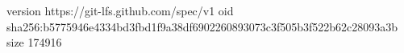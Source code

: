 version https://git-lfs.github.com/spec/v1
oid sha256:b5775946e4334bd3fbd1f9a38df6902260893073c3f505b3f522b62c28093a3b
size 174916
